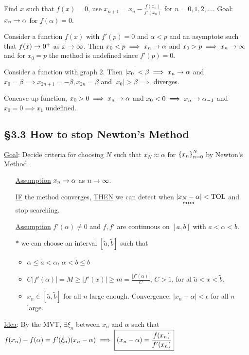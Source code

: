 \documentclass[]{article}
\begin{document}
Find $x$ such that $f(x)=0$, use $x_{n+1}=x_n-\frac{f(x_n)}{f'(x_n)}$ for $n=0,1,2,\dots$.
Goal: $x_n\rightarrow\alpha$ for $f(\alpha)=0$.

\begin{example}
	Consider a function $f(x)$ with $f'(p)=0$ and $\alpha<p$ and an asymptote such that $f(x)\rightarrow0^+$ as $x\rightarrow\infty$. Then $x_0<p \implies x_n\rightarrow\alpha$ and $x_0>p\implies x_n\rightarrow\infty$ and for $x_0=p$ the method is undefined since $f'(p)=0$.
\end{example}
\begin{example}
	Consider a function with graph 2. Then $|x_0|<\beta \implies x_n\rightarrow\alpha$ and $x_0=\beta\implies x_{2n+1}=-\beta,x_{2n}=\beta$ and $|x_0|>\beta\implies$ diverges.
\end{example}
\begin{example}
	Concave up function, $x_0>0\implies x_n\rightarrow\alpha$ and $x_0<0\implies x_n\rightarrow \alpha_{-1}$ and $x_0=0\implies x_1$ undefined.
\end{example}

\subsection*{\S3.3 How to stop Newton's Method}

\ul{Goal}: Decide criteria for choosing $N$ such that $x_N\approx\alpha$ for $\left\{ x_n \right\}_{n=0}^N$ by Newton's Method.
\begin{enumerate}
	\item[] \ul{Assumption} $x_n\rightarrow\alpha$ as $n\rightarrow\infty$. 

	\item[] \ul{IF} the method converges, \ul{THEN} we can detect when $|\underset{\text{error}}{x_N-\alpha}|<\text{TOL}$ and stop searching.

	\item[] \ul{Assumption} $f'(\alpha)\neq0$ and $f,f'$ are continuous on $[a,b]$ with $a<\alpha<b$.

	\item[$*$] we can choose an interval $[\tilde a,\tilde b]$ such that
		\begin{itemize}
			\item $\alpha\leq\tilde a<\alpha$, $\alpha<\tilde b\leq b$
			\item $C|f'(\alpha)| = M\geq |f'(x)|\geq m = \frac{|f'(\alpha)|}C$, $C>1$, for al $\tilde a<x<\tilde b$.
			\item $x_n\in[\tilde a,\tilde b]$ for all $n$ large enough. Convergence: $|x_n-\alpha|<\epsilon$ for all $n$ large.
		\end{itemize}
\end{enumerate}
\ul{Idea}: By the MVT, $\exists \xi_n$ between $x_n$ and $\alpha$ such that $f(x_n)-f(\alpha) = f'(\xi_n)(x_n-\alpha) \implies \fbox{$\displaystyle(x_n-\alpha) = \frac{f(x_n)}{f'(x_n)}$}$
\end{document}

